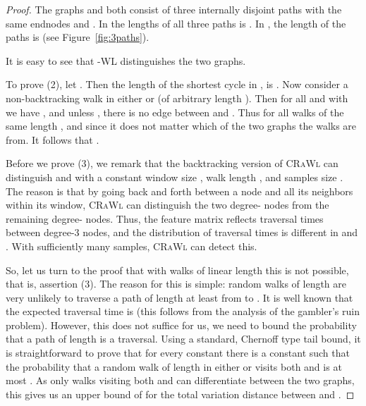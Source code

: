 \documentclass{scrartcl} \usepackage[dvipsnames]{xcolor}
\newcommand{\crawl}{\textsc{CRaWl}}
\begin{document}
\begin{proof}
  The graphs  and  both consist of three internally
  disjoint paths with the same endnodes  and . In  the lengths of
  all three paths is . In , the length of the
  paths is  (see
  Figure~\ref{fig:3paths}). 
  
  
  \medskip
  It is easy to see that -WL
distinguishes the two graphs. 

\medskip
To prove (2), 
let . Then the length of the shortest
cycle in ,  is . Now consider a non-backtracking walk
 in either  or  (of arbitrary length
). Then for all  and  with  we have
, and unless , there is no edge  between  and
. Thus  for all walks  of the same length ,
and since it does not matter which of the two graphs  the
walks are from. It follows that .

\medskip
Before we prove (3), we remark that the backtracking version of \crawl{} can distinguish
 and  with a constant window size
, walk length , and samples size . The reason
is that by going back and forth between a node and all its
neighbors within its window, \crawl{} can distinguish the two degree-
nodes  from the remaining degree- nodes. Thus, the feature matrix reflects traversal times between degree-3 nodes, and the distribution of traversal times is different in  and .
With sufficiently many samples, \crawl{} can detect this.

So, let us turn to the proof that with walks of linear length this is not possible, that is, assertion (3). 
The reason for this is simple:
random walks of length  are very unlikely to traverse a path
of length at least  from  to . It is well known that the expected
traversal time is  (this follows from the analysis of the
gambler's ruin problem). However, this does not suffice for us, we
need to bound the probability that a path of length  is a
traversal. Using a standard, Chernoff type tail bound, it is
straightforward to prove that for every constant
 there is a constant  such that the probability that a
random walk of length  in either  or  visits both 
and  is at most
. As only walks visiting both  and  can
differentiate between the two graphs, this gives us an upper bound of
 for the total variation distance between  and
. 
\end{proof}

 
\end{document}
